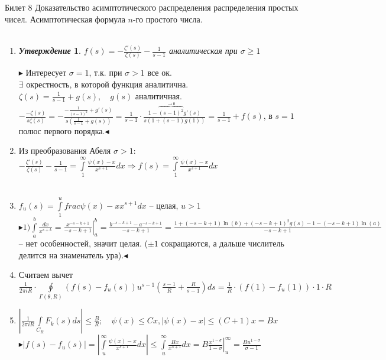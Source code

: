\documentclass[a4paper,12pt]{article}
\newtheorem{utv}{\textit{Утверждение}}
\newcommand{\TE}{\theta}
\newcommand{\SI}{\psi}
\newcommand{\q}{\quad}
\newcommand{\pb}{\blacktriangleright}
\newcommand{\pe}{\blacktriangleleft}
\newcommand{\Ra}{\Rightarrow}
\newcommand{\IL}{\int\limits}
\newcommand{\os}{\left(}
\newcommand{\cs}{\right)}
\begin{document}
\newpage
\begin{mybox}{\hypertarget{bil8}{Билет 8}}
Доказательство асимптотического распределения распределения простых чисел. Асимптотическая формула $n$-го простого числа.\\\q\\
\begin{enumerate}
    \item
\begin{utv} $f(s) = -\frac{\zeta'(s)}{\zeta(s)} - \frac{1}{s-1} $ аналитическая при $\sigma \ge 1$
\end{utv}
$\pb$ Интересует $\sigma = 1$, т.к. при $\sigma > 1$ все ок.\\
$\exists$ окрестность, в которой функция аналитична.\\
$\zeta(s) = \frac{1}{s-1} + g(s),\q g(s)$  аналитичная.\\
$-\frac{-\zeta(s)}{s\zeta(s)} = -\frac{-\frac{1}{(s-1)^2} + g'(s)}{s\os \frac{1}{s-1} + g(s) \cs} = \frac{1}{s-1} \cdot \frac{1 - \overbrace{(s-1)^2}^{\to 0} g'(s)}{s (1 + (s-1)g(1))} = \frac{1}{s-1} + f(s)$, в $s = 1$ полюс первого порядка.$\pe$
\item Из преобразования Абеля $\sigma > 1$: $-\frac{\zeta'(s)}{\zeta(s)} - \frac{1}{s-1} = \IL_1^\infty\frac{\SI(x) - x}{x^{s+1}}dx\Ra f(s) = \IL_1^\infty\frac{\SI(x) - x}{x^{s+1}}dx $\\\q\\
\item $f_u(s) = \IL_1^u frac{\SI(x) - x}{x^{s+1}}dx$ -- целая, $u > 1$\\
$\pb  1) \IL_a^b \frac{dx}{x^{s+k}} = \left.\frac{x^{-s-k+1}}{-s-k+1} \right|_a^b = \frac{b^{-s-k+1} - a^{-s-k+1}}{-s-k+1} = \frac{1 + (-s-k+1)\ln(b) + (-s-k+1)^2g(s) -1 - (-s-k+1)\ln(a)}{-s-k+1} $ -- нет особенностей, значит целая. ($\pm 1 $ сокращаются, а дальше числитель делится на знаменатель ура).$\pe$
\item Считаем вычет $\frac{1}{2\pi i R}\cdot \oint\limits_{\Gamma(\TE,R)}(f(s) - f_u(s)) u^{s-1}\os \frac{s-1}{R} + \frac{R}{s-1}  \cs ds = \frac{1}{R}\cdot (f(1) - f_u(1)) \cdot 1 \cdot R $
\item $\left| \frac{1}{2\pi i R} \IL_{C_R}F_k(s)ds \right| \le \frac{B}{R};\q\SI(x) \le Cx, |\SI(x) - x|\le (C+1)x = Bx$\\
$\pb |f(s) - f_u(s)| = \left| \IL_u^\infty \frac{\SI(x) - x}{x^{s+1}}dx   \right| \le \IL_u^\infty \frac{Bx}{x^{s+1}}dx = \left.B\frac{x^{1-\sigma}}{1-\sigma}\right|_u^\infty = \frac{Bu^{1-\sigma}}{\sigma - 1}  $\\

\end{enumerate}
\end{mybox}
\end{document}
